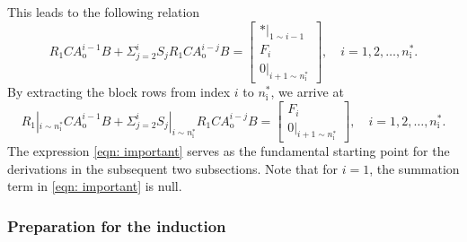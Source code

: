 \documentclass[sort&compress]{elsarticle}
\newcommand\Ao{A_\mathrm o}
\newcommand\nsharp{n_\mathrm i^*}
\begin{document}
This leads to the following relation
\[
R_1 C \Ao^{i-1}B +
\Sigma_{j=2}^i S_j R_1 C \Ao^{i-j}B
= \begin{bmatrix}
*|_{1\sim i-1} \\ F_i \\ 0|_{i+1\sim\nsharp}
\end{bmatrix},
\quad i=1,2,\dots,\nsharp.
\]
By extracting the block rows from index $i$ to $\nsharp$, we arrive at
\begin{equation}\label{eqn: important}
R_1|_{i\sim\nsharp} C \Ao^{i-1}B + \Sigma_{j=2}^i S_j|_{i\sim\nsharp} R_1 C \Ao^{i-j}B
= \begin{bmatrix} F_i \\ 0|_{i+1\sim\nsharp} \end{bmatrix},
\quad i=1,2,\dots,\nsharp.
\end{equation}
The expression \eqref{eqn: important} serves as the fundamental starting point
for the derivations in the subsequent two subsections.
Note that for $i=1$, the summation term in \eqref{eqn: important} is null.

\subsubsection{Preparation for the induction}
\end{document}

